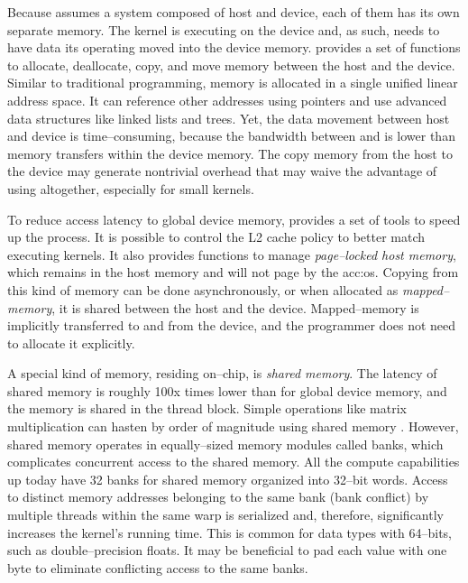 Because \cuda assumes a system composed of host and device, each of them has its own separate memory. The kernel is executing on the device and, as such, needs to have data its operating moved into the device memory. \cuda provides a set of functions to allocate, deallocate, copy, and move memory between the host and the device. Similar to traditional \cpp programming, \cuda memory is allocated in a single unified linear address space. It can reference other addresses using pointers and use advanced data structures like linked lists and trees. Yet, the data movement between host and device is time--consuming, because the bandwidth between \cpu and \gpu is lower than memory transfers within the device memory. The copy memory from the host to the device may generate nontrivial overhead that may waive the advantage of using \gpu altogether, especially for small kernels. 

To reduce access latency to global device memory, \cuda provides a set of tools to speed up the process. It is possible to control the L2 cache policy to better match executing kernels. It also provides functions to manage \emph{page--locked host memory}, which remains in the host memory and will not page by the \acrshort{acc:os}. Copying from this kind of memory can be done asynchronously, or when allocated as \emph{mapped--memory}, it is shared between the host and the device. Mapped--memory is implicitly transferred to and from the device, and the programmer does not need to allocate it explicitly.

A special kind of memory, residing on--chip, is \emph{shared memory}. The latency of shared memory is roughly 100x times lower than for global device memory, and the memory is shared in the thread block. Simple operations like matrix multiplication can hasten by order of magnitude using shared memory \citep{MatrixMultiplicationGPU}. However, shared memory operates in equally--sized memory modules called banks, which complicates concurrent access to the shared memory. All the compute capabilities up today have 32 banks for shared memory organized into 32--bit words. Access to distinct memory addresses belonging to the same bank (bank conflict) by multiple threads within the same warp is serialized and, therefore, significantly increases the kernel's running time. This is common for data types with 64--bits, such as double--precision floats. It may be beneficial to pad each value with one byte to eliminate conflicting access to the same banks.

